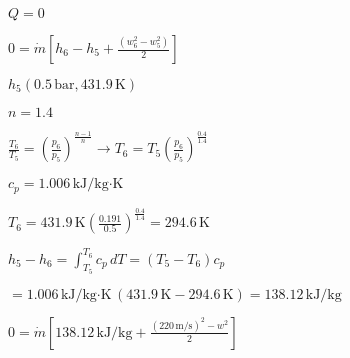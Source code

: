 \( Q = 0 \)

\( 0 = \dot{m} \left[ h_6 - h_5 + \frac{(w_6^2 - w_5^2)}{2} \right] \)

\( h_5 (0.5 \, \text{bar}, 431.9 \, \text{K}) \)

\( n = 1.4 \)

\( \frac{T_6}{T_5} = \left( \frac{p_6}{p_5} \right)^{\frac{n-1}{n}} \rightarrow T_6 = T_5 \left( \frac{p_6}{p_5} \right)^{\frac{0.4}{1.4}} \)

\( c_p = 1.006 \, \text{kJ/kg·K} \)

\( T_6 = 431.9 \, \text{K} \left( \frac{0.191}{0.5} \right)^{\frac{0.4}{1.4}} = 294.6 \, \text{K} \)

\( h_5 - h_6 = \int_{T_5}^{T_6} c_p \, dT = (T_5 - T_6) c_p \)

\( = 1.006 \, \text{kJ/kg·K} \, (431.9 \, \text{K} - 294.6 \, \text{K}) = 138.12 \, \text{kJ/kg} \)

\( 0 = \dot{m} \left[ 138.12 \, \text{kJ/kg} + \frac{(220 \, \text{m/s})^2 - w^2}{2} \right] \)